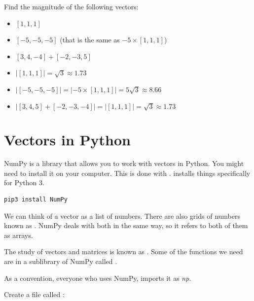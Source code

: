\begin{Exercise}[title={Magnitude of a Vector}, label=vector_mag]
    Find the magnitude of the following vectors:
    \begin{itemize}
        \item $[1, 1, 1]$
        \item $[-5, -5, -5]$ (that is the same as $-5 \times [1, 1, 1]$)
        \item $[3, 4, -4] + [-2, -3, 5]$
    \end{itemize}
    \end{Exercise}
    \begin{Answer}[ref=vector_mag]
        \begin{itemize}
            \item $|[1, 1, 1]| = \sqrt{3} \approx 1.73 $
            \item $|[-5, -5, -5]| = |-5 \times [1,1,1]| = 5 \sqrt{3} \approx 
            8.66$
            \item $|[3, 4, 5] + [-2, -3, -4]| = | [1,1,1] | = \sqrt{3} 
            \approx 1.73$ 
        \end{itemize}
    \end{Answer}

\section{Vectors in Python}

NumPy is a library that allows you to work with vectors in Python. You might 
need to install it on your computer. This is done with . 
 installs things specifically for Python 3.

\begin{Verbatim}
pip3 install NumPy
\end{Verbatim}

We can think of a vector as a list of numbers.  
There are also grids of numbers known as . NumPy deals with 
both in the same way, so it refers to both of them as arrays.

The study of vectors and matrices is known as . Some 
of the functions we need are in a sublibrary of NumPy called . 

As a convention, everyone who uses NumPy, imports it as \textit{np}. 

Create a file called :

